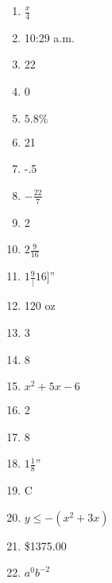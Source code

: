 \documentclass[../uilmath.tex]{subfiles}
\begin{document}
\begin{enumerate}[label=\bfseries\arabic*.]
    \item %
    $\frac{x}{4}$

    \item %
    10:29 a.m. 

    \item %
    22 

    \item %
    0

    \item %
    $5.8\%$

    \item %
    21

    \item %
    -.5

    \item %
    $-\frac{22}{7}$

    \item %
    2

    \item %
    $2\frac{9}{16}$

    \item %
    $1\frac{9}[16]$''

    \item %
    120 oz 

    \item %
    3 

    \item %
    8

    \item %
    $x^2+5x-6$

    \item %
    2 

    \item %
    8

    \item %
    $1\frac{1}{8}$''

    \item %
    C 

    \item %
    $y\leq -(x^2+3x)$

    \item %
    \$1375.00

    \item %
    $a^0 b^{-2}$


\end{enumerate}
\end{document}
